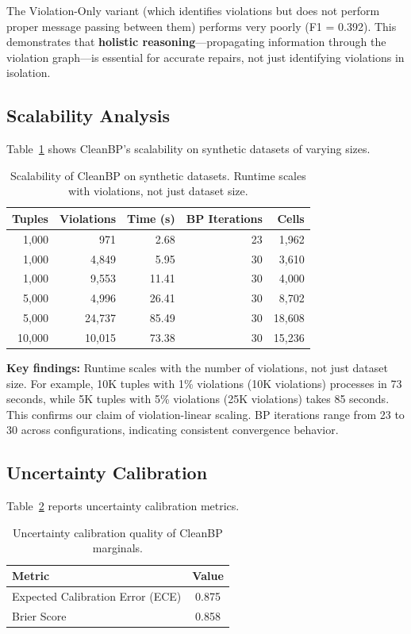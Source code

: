 \documentclass{article}
\begin{document}
The Violation-Only variant (which identifies violations but does not perform proper message passing between them) performs very poorly (F1 = 0.392). This demonstrates that \textbf{holistic reasoning}---propagating information through the violation graph---is essential for accurate repairs, not just identifying violations in isolation.

\subsection{Scalability Analysis}

Table~\ref{tab:scalability} shows CleanBP's scalability on synthetic datasets of varying sizes.

\begin{table}[t]
\centering
\caption{Scalability of CleanBP on synthetic datasets. Runtime scales with violations, not just dataset size.}
\label{tab:scalability}
\begin{tabular}{rrrrr}
\toprule
Tuples & Violations & Time (s) & BP Iterations & Cells \\
\midrule
1,000 & 971 & 2.68 & 23 & 1,962 \\
1,000 & 4,849 & 5.95 & 30 & 3,610 \\
1,000 & 9,553 & 11.41 & 30 & 4,000 \\
5,000 & 4,996 & 26.41 & 30 & 8,702 \\
5,000 & 24,737 & 85.49 & 30 & 18,608 \\
10,000 & 10,015 & 73.38 & 30 & 15,236 \\
\bottomrule
\end{tabular}
\end{table}

\textbf{Key findings:} Runtime scales with the number of violations, not just dataset size. For example, 10K tuples with 1\% violations (10K violations) processes in 73 seconds, while 5K tuples with 5\% violations (25K violations) takes 85 seconds. This confirms our claim of violation-linear scaling. BP iterations range from 23 to 30 across configurations, indicating consistent convergence behavior.

\subsection{Uncertainty Calibration}

Table~\ref{tab:calibration} reports uncertainty calibration metrics.

\begin{table}[t]
\centering
\caption{Uncertainty calibration quality of CleanBP marginals.}
\label{tab:calibration}
\begin{tabular}{lc}
\toprule
Metric & Value \\
\midrule
Expected Calibration Error (ECE) & 0.875 \\
Brier Score & 0.858 \\
\bottomrule
\end{tabular}
\end{table}
\end{document}
